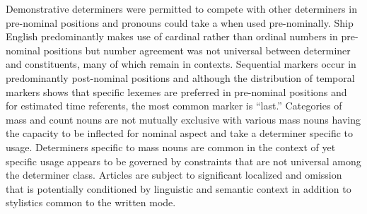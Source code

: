 Demonstrative determiners were permitted to compete with other determiners in pre-nominal positions and  pronouns could take a  when used pre-nominally. Ship English predominantly makes use of cardinal rather than ordinal numbers in pre-nominal positions but number agreement was not universal between determiner and  constituents, many of which remain  in  contexts. Sequential markers occur in predominantly post-nominal positions and although the distribution of temporal markers shows that specific lexemes are preferred in pre-nominal positions and for estimated time referents, the most common marker is “last.”  Categories of mass and count nouns are not mutually exclusive with various mass nouns having the capacity to be inflected for  nominal aspect and take a determiner specific to  usage. Determiners specific to mass nouns are common in the context of  yet specific usage appears to be governed by constraints that are not universal among the determiner class.  Articles are subject to significant localized  and omission that is potentially conditioned by linguistic and semantic context in addition to stylistics common to the written mode.

